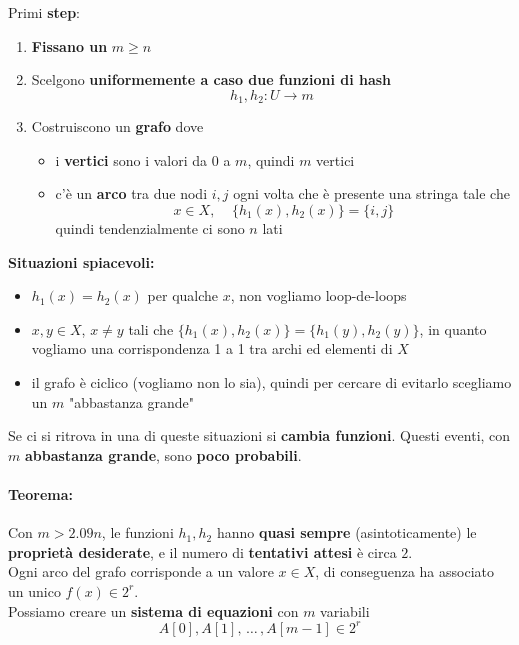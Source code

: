 Primi \textbf{step}:
\begin{enumerate}
	\item \textbf{Fissano un} $m \geq n$
	\item Scelgono \textbf{uniformemente a caso due funzioni di hash}
	$$ h_1, h_2: U \rightarrow m $$
	\item Costruiscono un \textbf{grafo} dove
	\begin{itemize}
		\item i \textbf{vertici} sono i valori da $0$ a $m$, quindi $m$ vertici
		\item c'è un \textbf{arco} tra due nodi $i,j$ ogni volta che è presente una stringa tale che 
		$$x \in X, \;\;\;\; \{h_1(x), h_2(x)\} = \{i,j\} $$
		quindi tendenzialmente ci sono $n$ lati
	\end{itemize}
\end{enumerate}

\textbf{Situazioni spiacevoli:} 
\begin{itemize}
	\item $h_1(x) = h_2 (x)$ per qualche $x$, non vogliamo loop-de-loops
	\item $x,y \in X$, $x \neq y$ tali che $\{h_1 (x), h_2 (x)\} = \{h_1 (y), h_2 (y)\}$, in quanto vogliamo una corrispondenza 1 a 1 tra archi ed elementi di $X$
	\item il grafo è ciclico (vogliamo non lo sia), quindi per cercare di evitarlo scegliamo un $m$ "abbastanza grande"
\end{itemize}
Se ci si ritrova in una di queste situazioni si \textbf{cambia funzioni}. Questi eventi, con $m$ \textbf{abbastanza grande}, sono \textbf{poco probabili}.

\newpage

\paragraph{Teorema:} Con $m > 2.09n$, le funzioni $h_1, h_2$ hanno \textbf{quasi sempre} (asintoticamente) le \textbf{proprietà desiderate}, e il numero di \textbf{tentativi attesi} è circa $2$.\\

Ogni arco del grafo corrisponde a un valore $x \in X$, di conseguenza ha associato un unico $f(x) \in 2^r$.\\

Possiamo creare un \textbf{sistema di equazioni} con $m$ variabili
$$ A[0], A[1], \, \dots \, , A[m-1] \in 2^r $$

